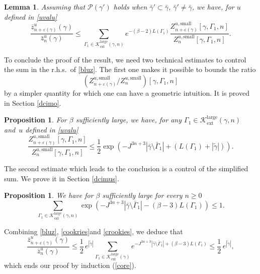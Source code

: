 \documentclass[JEP,XML,SOM,Unicode, NoFloatCountersInSection]{cedram}
\let\mathcal\mathscr
\numberwithin{equation}{section}
\theoremstyle{plain}
\newtheorem{lemma}[theorem]{Lemma}
\newtheorem{proposition}[theorem]{Proposition}
\theoremstyle{definition}
\newcommand{\ext}{\mathrm{ext}}
\newcommand{\sm}{\mathrm{small}}
\newcommand{\larg}{\mathrm{large}}
\newcommand{\cP}{{\ensuremath{\mathcal P}} }
\newcommand{\cK}{{\ensuremath{\mathcal K}} }
\newcommand{\gb}{\beta}
\newcommand{\gep}{\varepsilon}
\newcommand{\gG}{\Gamma}
\begin{document}
\begin{lemma}\label{decopoz}
Assuming that $\cP(\gamma')$ holds when $\bar \gamma' \subset \bar \gamma$, $\bar \gamma'\ne \bar \gamma$,
we have, for $u$ defined in \eqref{uvalu}
\begin{equation}\label{bluz}
\frac{\bar z^u_{n+\gep(\gamma)}(\gamma)}{\bar z^u_{n}(\gamma)}\le \sum_{\gG_1\in \cK^{\larg}_{\ext}(\gamma,n)}
e^{-(\gb-2) L(\gG_1) } \frac{Z^{u,\sm}_{n+\gep(\gamma)}[\gamma,\gG_1,n]}{Z^{u,\sm}_{n}[\gamma,\gG_1,n]}.
\end{equation}
\end{lemma}

To conclude the proof of the result, we need two technical estimates to control the sum in the r.h.s.\ of \eqref{bluz}.
The first one makes it possible to bounds the ratio
\[
(Z^{u,\sm}_{n+\gep(\gamma)}/ Z^{u,\sm}_{n})[\gamma,\gG_1,n]
\]
by a simpler quantity for which one can have a
geometric intuition. It is proved in Section \ref{dcimo}.
\begin{proposition}\label{difficilissimo}
For $\gb$ sufficiently large, we have, for any $\gG_1\in \cK^{\larg}_{\ext}(\gamma,n)$ and~$u$ defined in \eqref{uvalu}
\begin{equation}\label{cookries}
\frac{Z^{u,\sm}_{n+\gep(\gamma)}[\gamma,\Gamma_1,n]}{Z^{u,\sm}_{n}[\gamma,\Gamma_1,n]}\le \frac{1}{2}
\exp\left(-J^{3n+3}|\bar \gamma\setminus \bar \gG_1|+(L(\gG_1)+|\tilde \gamma|)\right).
\end{equation}
\end{proposition}
The second estimate which leads to the conclusion is a control of the simplified sum.
We prove it in Section \ref{dcimus}.
\begin{proposition}\label{dificilissimus}
We have for $\gb$ sufficiently large for every $n\ge 0$
\begin{equation}\label{crookies}
\sum_{\gG_1\in \cK^{\larg}_{\ext}(\gamma,n)} \exp\left(-J^{3n+3}|\bar \gamma\setminus \bar \gG_1|-(\gb-3) L(\gG_1) \right)\le 1.
\end{equation}
\end{proposition}
Combining \eqref{bluz}, \eqref{cookries}and \eqref{crookies}, we deduce that
\begin{equation*}
\frac{\bar z^{u}_{n+\gep(\gamma)}(\gamma)}{\bar z^{u}_n(\gamma)}\le \frac{1}{2}\,e^{|\tilde \gamma|}
\sum_{\gG_1\in \cK^{\larg}_{\ext}(\gamma)} e^{-J^{3n+3} |\bar \gamma\setminus \bar \Gamma_1|+(\gb-3)L(\gG_1)}\le \frac{1}{2}\, e^{|\tilde \gamma|},
\end{equation*}
which ends our proof by induction (\cf \eqref{core}).
\end{document}
